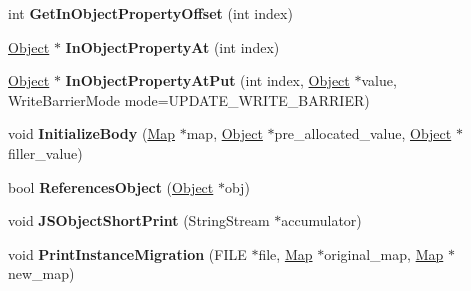 \begin{DoxyCompactItemize}
\item 
\hypertarget{classv8_1_1internal_1_1_j_s_object_a4f8ffe19e26ca55d11efe84d24e08c13}{}int {\bfseries Get\+In\+Object\+Property\+Offset} (int index)\label{classv8_1_1internal_1_1_j_s_object_a4f8ffe19e26ca55d11efe84d24e08c13}

\item 
\hypertarget{classv8_1_1internal_1_1_j_s_object_a2780a1cf5386b77bd61264ea2831bbb1}{}\hyperlink{classv8_1_1internal_1_1_object}{Object} $\ast$ {\bfseries In\+Object\+Property\+At} (int index)\label{classv8_1_1internal_1_1_j_s_object_a2780a1cf5386b77bd61264ea2831bbb1}

\item 
\hypertarget{classv8_1_1internal_1_1_j_s_object_a0b2a8eedcdcfd224ad0fb511381fbe4d}{}\hyperlink{classv8_1_1internal_1_1_object}{Object} $\ast$ {\bfseries In\+Object\+Property\+At\+Put} (int index, \hyperlink{classv8_1_1internal_1_1_object}{Object} $\ast$value, Write\+Barrier\+Mode mode=U\+P\+D\+A\+T\+E\+\_\+\+W\+R\+I\+T\+E\+\_\+\+B\+A\+R\+R\+I\+E\+R)\label{classv8_1_1internal_1_1_j_s_object_a0b2a8eedcdcfd224ad0fb511381fbe4d}

\item 
\hypertarget{classv8_1_1internal_1_1_j_s_object_a36e323378a363f2ccfe34db5a77b0576}{}void {\bfseries Initialize\+Body} (\hyperlink{classv8_1_1internal_1_1_map}{Map} $\ast$map, \hyperlink{classv8_1_1internal_1_1_object}{Object} $\ast$pre\+\_\+allocated\+\_\+value, \hyperlink{classv8_1_1internal_1_1_object}{Object} $\ast$filler\+\_\+value)\label{classv8_1_1internal_1_1_j_s_object_a36e323378a363f2ccfe34db5a77b0576}

\item 
\hypertarget{classv8_1_1internal_1_1_j_s_object_a7055378a4956dab348a946e35ab9bf9b}{}bool {\bfseries References\+Object} (\hyperlink{classv8_1_1internal_1_1_object}{Object} $\ast$obj)\label{classv8_1_1internal_1_1_j_s_object_a7055378a4956dab348a946e35ab9bf9b}

\item 
\hypertarget{classv8_1_1internal_1_1_j_s_object_a462b6fa796709b5af86864e5f67527a8}{}void {\bfseries J\+S\+Object\+Short\+Print} (String\+Stream $\ast$accumulator)\label{classv8_1_1internal_1_1_j_s_object_a462b6fa796709b5af86864e5f67527a8}

\item 
\hypertarget{classv8_1_1internal_1_1_j_s_object_a3e219048c09af8905b93304bbb119f8d}{}void {\bfseries Print\+Instance\+Migration} (F\+I\+L\+E $\ast$file, \hyperlink{classv8_1_1internal_1_1_map}{Map} $\ast$original\+\_\+map, \hyperlink{classv8_1_1internal_1_1_map}{Map} $\ast$new\+\_\+map)\label{classv8_1_1internal_1_1_j_s_object_a3e219048c09af8905b93304bbb119f8d}


\end{DoxyCompactItemize}
